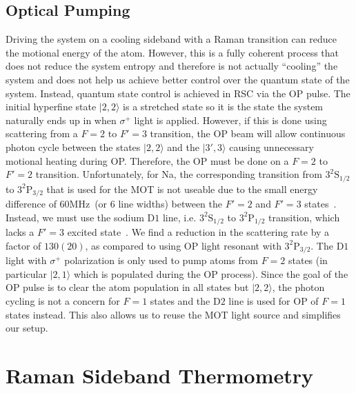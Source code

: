 \subsection{Optical Pumping}
\label{ch:rsc:basic-theory:op}


Driving the system on a cooling sideband with a Raman transition can reduce the
motional energy of the atom. However, this is a fully coherent process
that does not reduce the system entropy and therefore is not actually ``cooling'' the system
and does not help us achieve better control over the quantum state of the system.
Instead, quantum state control is achieved in RSC via the OP pulse.
The initial hyperfine state $|2,2\rangle$ is a stretched state so it is the
state the system naturally ends up in when $\sigma^+$ light is applied.
However, if this is done using scattering from a $F=2$ to $F'=3$ transition,
the OP beam will allow continuous photon cycle
between the states $|2,2\rangle$ and the $|3',3\rangle$
causing unnecessary motional heating during OP.
Therefore, the OP must be done on a $F=2$ to $F'=2$ transition.
Unfortunately, for Na, the corresponding transition
from $\mathrm{3^2S_{1/2}}$ to $\mathrm{3^2P_{3/2}}$
that is used for the MOT is not useable due to the small energy difference of
$60 \mathrm{MHz}$~(or $6$ line widths) between the $F'=2$ and
$F'=3$ states~\cite{steck_sodium_2019}.
Instead, we must use the sodium $\mathrm{D1}$ line,
i.e. $\mathrm{3^2S_{1/2}}$ to $\mathrm{3^2P_{1/2}}$ transition,
which lacks a $F'=3$ excited state~\cite{monroe_resolved-sideband_1995,grobner_degenerate_2017}.
We find a reduction in the scattering rate by a factor of $130(20)$,
as compared to using OP light resonant with $\mathrm{3^2P_{3/2}}$.
The $\mathrm{D1}$ light with $\sigma^+$ polarization is only used to pump atoms from
$F=2$ states (in particular $|2,1\rangle$ which is populated during the OP process).
Since the goal of the OP pulse is to clear the atom population in all states but $|2,2\rangle$,
the photon cycling is not a concern for $F=1$ states and the $\mathrm{D2}$ line
is used for OP of $F=1$ states instead.
This also allows us to reuse the MOT light source and simplifies our setup.

\section{Raman Sideband Thermometry}
\label{ch:rsc:thermometry}

